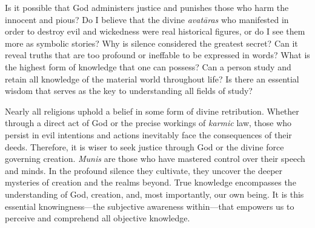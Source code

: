\begin{mananam}{}
\normalfont\mananamtext Is it possible that God administers justice and punishes those who harm the innocent and pious? Do I believe that the divine \emph{avatāras} who manifested in order to destroy evil and wickedness were real historical figures, or do I see them more as symbolic stories?
Why is silence considered the greatest secret? Can it reveal truths that are too profound or ineffable to be expressed in words?
What is the highest form of knowledge that one can possess? Can a person study and retain all knowledge of the material world throughout life?
Is there an essential wisdom that serves as the key to understanding all fields of study?
\end{mananam}
\sreflect
\begin{inspiration}{}
\normalfont\mananamtext Nearly all religions uphold a belief in some form of divine retribution. Whether through a direct act of God or the precise workings of \emph{karmic} law, those who persist in evil intentions and actions inevitably face the consequences of their deeds. Therefore, it is wiser to seek justice through God or the divine force governing creation.
\emph{Munis} are those who have mastered control over their speech and minds. In the profound silence they cultivate, they uncover the deeper mysteries of creation and the realms beyond.
True knowledge encompasses the understanding of God, creation, and, most importantly, our own being. It is this essential knowingness—the subjective awareness within—that empowers us to perceive and comprehend all objective knowledge.
\end{inspiration}
\newpage

